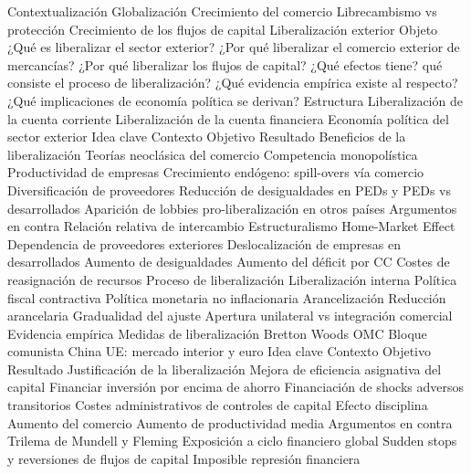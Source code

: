 \documentclass{nuevotema}
\begin{document}
\begin{esquema}[enumerate]
	\1[] 
		\2 Contextualización
			\3 Globalización
			\3 Crecimiento del comercio
			\3 Librecambismo vs protección
			\3 Crecimiento de los flujos de capital
			\3 Liberalización exterior
		\2 Objeto
			\3 ¿Qué es liberalizar el sector exterior?
			\3 ¿Por qué liberalizar el comercio exterior de mercancías?
			\3 ¿Por qué liberalizar los flujos de capital?
			\3 ¿Qué efectos tiene?
			\3 qué consiste el proceso de liberalización?
			\3 ¿Qué evidencia empírica existe al respecto?
			\3 ¿Qué implicaciones de economía política se derivan?
		\2 Estructura
			\3 Liberalización de la cuenta corriente
			\3 Liberalización de la cuenta financiera
			\3 Economía política del sector exterior
	\1 
		\2 Idea clave
			\3 Contexto
			\3 Objetivo
			\3 Resultado
		\2 Beneficios de la liberalización
			\3 Teorías neoclásica del comercio
			\3 Competencia monopolística
			\3 Productividad de empresas
			\3 Crecimiento endógeno: spill-overs vía comercio
			\3 Diversificación de proveedores
			\3 Reducción de desigualdades en PEDs y PEDs vs desarrollados
			\3 Aparición de lobbies pro-liberalización en otros países
		\2 Argumentos en contra
			\3 Relación relativa de intercambio
			\3 Estructuralismo
			\3 Home-Market Effect
			\3 Dependencia de proveedores exteriores
			\3 Deslocalización de empresas en desarrollados
			\3 Aumento de desigualdades
			\3 Aumento del déficit por CC
			\3 Costes de reasignación de recursos
		\2 Proceso de liberalización
			\3 Liberalización interna
			\3 Política fiscal contractiva
			\3 Política monetaria no inflacionaria
			\3 Arancelización
			\3 Reducción arancelaria
			\3 Gradualidad del ajuste
			\3 Apertura unilateral vs integración comercial
		\2 Evidencia empírica
			\3 Medidas de liberalización
			\3 Bretton Woods
			\3 OMC
			\3 Bloque comunista
			\3 China
			\3 UE: mercado interior y euro
	\1 
		\2 Idea clave
			\3 Contexto
			\3 Objetivo
			\3 Resultado
		\2 Justificación de la liberalización
			\3 Mejora de eficiencia asignativa del capital
			\3 Financiar inversión por encima de ahorro
			\3 Financiación de shocks adversos transitorios
			\3 Costes administrativos de controles de capital
			\3 Efecto disciplina
			\3 Aumento del comercio
			\3 Aumento de productividad media
		\2 Argumentos en contra
			\3 Trilema de Mundell y Fleming
			\3 Exposición a ciclo financiero global
			\3 Sudden stops y reversiones de flujos de capital
			\3 Imposible represión financiera

\end{esquema}
\end{document}
